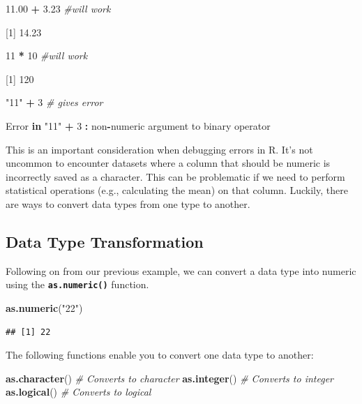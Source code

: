 \documentclass[
]{book}
\newenvironment{Shaded}{\begin{snugshade}}{\end{snugshade}}
\newcommand{\CommentTok}[1]{\textcolor[rgb]{0.56,0.35,0.01}{\textit{#1}}}
\newcommand{\ControlFlowTok}[1]{\textcolor[rgb]{0.13,0.29,0.53}{\textbf{#1}}}
\newcommand{\DecValTok}[1]{\textcolor[rgb]{0.00,0.00,0.81}{#1}}
\newcommand{\FloatTok}[1]{\textcolor[rgb]{0.00,0.00,0.81}{#1}}
\newcommand{\FunctionTok}[1]{\textcolor[rgb]{0.13,0.29,0.53}{\textbf{#1}}}
\newcommand{\NormalTok}[1]{#1}
\newcommand{\SpecialCharTok}[1]{\textcolor[rgb]{0.81,0.36,0.00}{\textbf{#1}}}
\newcommand{\StringTok}[1]{\textcolor[rgb]{0.31,0.60,0.02}{#1}}
\begin{document}
\begin{Shaded}
\begin{Highlighting}[]
\FloatTok{11.00} \SpecialCharTok{+} \FloatTok{3.23} \CommentTok{\#will work}

\NormalTok{[}\DecValTok{1}\NormalTok{] }\FloatTok{14.23}


\DecValTok{11} \SpecialCharTok{*} \DecValTok{10} \CommentTok{\#will work}

\NormalTok{[}\DecValTok{1}\NormalTok{] }\DecValTok{120}

\StringTok{"11"} \SpecialCharTok{+} \DecValTok{3} \CommentTok{\# gives error}

\NormalTok{Error }\ControlFlowTok{in} \StringTok{"11"} \SpecialCharTok{+} \DecValTok{3} \SpecialCharTok{:}\NormalTok{ non}\SpecialCharTok{{-}}\NormalTok{numeric argument to binary operator}
\end{Highlighting}
\end{Shaded}

This is an important consideration when debugging errors in R. It's not uncommon to encounter datasets where a column that should be numeric is incorrectly saved as a character. This can be problematic if we need to perform statistical operations (e.g., calculating the mean) on that column. Luckily, there are ways to convert data types from one type to another.

\subsection{Data Type Transformation}\label{data-type-transformation}

Following on from our previous example, we can convert a data type into numeric using the \textbf{\texttt{as.numeric()}} function.

\begin{Shaded}
\begin{Highlighting}[]
\FunctionTok{as.numeric}\NormalTok{(}\StringTok{"22"}\NormalTok{)}
\end{Highlighting}
\end{Shaded}

\begin{verbatim}
## [1] 22
\end{verbatim}

The following functions enable you to convert one data type to another:

\begin{Shaded}
\begin{Highlighting}[]
\FunctionTok{as.character}\NormalTok{()  }\CommentTok{\# Converts to character}
\FunctionTok{as.integer}\NormalTok{()    }\CommentTok{\# Converts to integer}
\FunctionTok{as.logical}\NormalTok{()    }\CommentTok{\# Converts to logical}
\end{Highlighting}
\end{Shaded}
\end{document}
